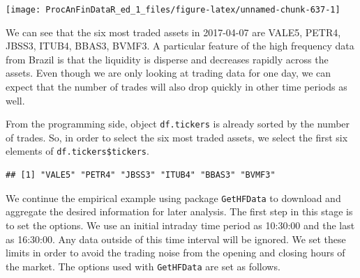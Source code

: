 \documentclass[11pt,]{book}
\newenvironment{Shaded}{\begin{snugshade}}{\end{snugshade}}
\newcommand{\KeywordTok}[1]{\textcolor[rgb]{0.27,0.27,0.27}{\textbf{#1}}}
\newcommand{\DecValTok}[1]{\textcolor[rgb]{0.06,0.06,0.06}{#1}}
\newcommand{\StringTok}[1]{\textcolor[rgb]{0.5,0.5,0.5}{#1}}
\newcommand{\CommentTok}[1]{\textcolor[rgb]{0.56,0.35,0.01}{\textit{#1}}}
\newcommand{\OperatorTok}[1]{\textcolor[rgb]{0.81,0.36,0.00}{\textbf{#1}}}
\newcommand{\NormalTok}[1]{#1}
\begin{document}
\begin{center}\texttt{[image: ProcAnFinDataR\_ed\_1\_files/figure-latex/unnamed-chunk-637-1]} \end{center}

We can see that the six most traded assets in 2017-04-07 are VALE5,
PETR4, JBSS3, ITUB4, BBAS3, BVMF3. A particular feature of the high
frequency data from Brazil is that the liquidity is disperse and
decreases rapidly across the assets. Even though we are only looking at
trading data for one day, we can expect that the number of trades will
also drop quickly in other time periods as well.

From the programming side, object \texttt{df.tickers} is already sorted
by the number of trades. So, in order to select the six most traded
assets, we select the first six elements of
\texttt{df.tickers\$tickers}.

\begin{Shaded}
\end{Shaded}

\begin{verbatim}
## [1] "VALE5" "PETR4" "JBSS3" "ITUB4" "BBAS3" "BVMF3"
\end{verbatim}

We continue the empirical example using package \texttt{GetHFData} to
download and aggregate the desired information for later analysis. The
first step in this stage is to set the options. We use an initial
intraday time period as 10:30:00 and the last as 16:30:00. Any data
outside of this time interval will be ignored. We set these limits in
order to avoid the trading noise from the opening and closing hours of
the market. The options used with \texttt{GetHFData} are set as follows.

\begin{Shaded}
\end{Shaded}
\end{document}
